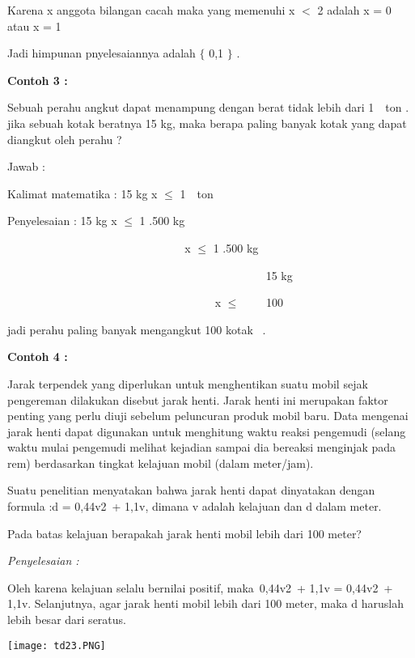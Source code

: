 \documentclass[11pt,fleqn]{book} %
\begin{document}
\noindent Karena x anggota bilangan cacah maka yang memenuhi x $<$ 2 adalah x = 0 atau x = 1

\noindent Jadi himpunan pnyelesaiannya adalah $\{$ 0,1 $\}$ .

\noindent \textbf{}

\noindent \textbf{Contoh 3 :}

\noindent Sebuah perahu angkut dapat menampung dengan berat tidak lebih dari 1~~ton . jika sebuah kotak beratnya 15 kg, maka berapa paling banyak kotak yang dapat diangkut oleh perahu ?

\noindent Jawab :

\noindent Kalimat matematika : 15 kg x $\mathrm{\le}$ 1~~ton

\noindent Penyelesaian : 15 kg x $\mathrm{\le}$ 1 .500 kg

\noindent ~~~~~~~~~~~~~~~~~~~~~~~ ~~~~~~~ x $\mathrm{\le}$ 1 .500 kg

\noindent ~~~~~~~~~~~~~~~~~~~~~~~~~~~~~~~~~~~~~~~~~~~~~ 15 kg

\noindent ~~~~~~~~~~~~~~~~~~~~~~~~~~~~~~~~~~~~ x $\mathrm{\le}$~~~~ 100

\noindent jadi perahu paling banyak mengangkut 100 kotak~ .~~~~~~

\noindent \textbf{Contoh 4 :}

\noindent Jarak terpendek yang diperlukan untuk menghentikan suatu mobil sejak pengereman dilakukan disebut jarak henti. Jarak henti ini merupakan faktor penting yang perlu diuji sebelum peluncuran produk mobil baru. Data mengenai jarak henti dapat digunakan untuk menghitung waktu reaksi pengemudi (selang waktu mulai pengemudi melihat kejadian sampai dia bereaksi menginjak pada rem) berdasarkan tingkat kelajuan mobil (dalam meter/jam).

\noindent Suatu penelitian menyatakan bahwa jarak henti dapat dinyatakan dengan formula :d = {\textbar}0,44v2~+ 1,1v{\textbar}, dimana v adalah kelajuan dan d dalam meter.

\noindent Pada batas kelajuan berapakah jarak henti mobil lebih dari 100 meter?

\noindent \textit{Penyelesaian :}

\noindent Oleh karena kelajuan selalu bernilai positif, maka~{\textbar}0,44v2~+ 1,1v{\textbar} = 0,44v2~+ 1,1v. Selanjutnya, agar jarak henti mobil lebih dari 100 meter, maka d haruslah lebih besar dari seratus.

\noindent \texttt{[image: td23.PNG]}\textbf{}
\end{document}
